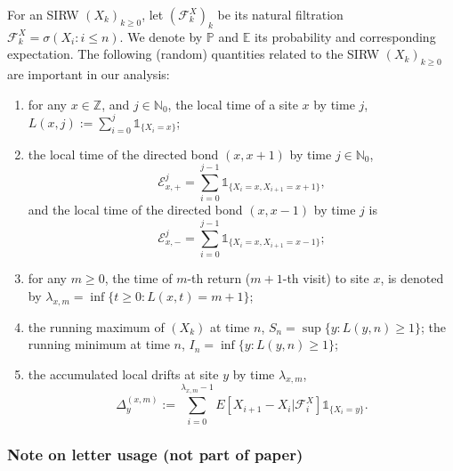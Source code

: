 \documentclass[twoside,12pt,a4paper]{article}
\numberwithin{equation}{section}
\begin{document}
	For an SIRW $(X_k)_{k\geq 0}$,  let $(\mathcal{F}^X_k)_k$ be its natural filtration $\mathcal{F}^X_k = \sigma\left(X_i: i\leq n \right).$ We denote by $\mathbb{P}$ and $\mathbb{E}$ its probability and corresponding expectation. The following (random) quantities related to the SIRW $(X_k)_{k\geq0}$ are important in our analysis:
	\begin{enumerate}
		\item for any $x \in \mathbb{Z}$, and $j\in \mathbb{N}_0$, the local time of a site $x$ by time $j$, $L(x,j):= \sum_{i=0}^j \mathbb{1}_{\{X_i=x\} }$; %
		
		\item the local time of the directed bond $(x,x+1)$ by time $j\in \mathbb{N}_0$,
		$$ \mathcal{E}^j_{x,+} = \sum_{i=0}^{j-1} \mathbb{1}_{\{X_i=x, X_{i+1} =x+1 \} } ,$$
		and the local time of the directed bond $(x,x-1)$ by time $j$ is 
		$$ \mathcal{E}^j_{x,-} = \sum_{i=0}^{j-1} \mathbb{1}_{\{X_i=x, X_{i+1} =x-1 \} }; $$
		
		
		\item for any $m\geq 0$, the time of $m$-th return ($m+1$-th visit) to site $x$, is denoted by $\lambda_{x,m} = \inf\{t \geq 0: L(x,t) = m+1 \}$;
		
		\item the running maximum of $(X_k)$ at time $n$, $S_n= \sup\{y: L(y,n)\geq 1 \} $; the running minimum at time $n$, $I_n= \inf\{y: L(y,n)\geq 1 \} $;
		
		\item 
		the accumulated local drifts at site $y$ by time $\lambda_{x,m}$, 
		\begin{equation}\label{eq: accumulated local drift}
			\Delta_y^{(x,m)}:= \sum_{i=0}^{\lambda_{x,m}-1} E[X_{i+1}-X_i\vert \mathcal{F}_{i}^X] \mathbb{1}_{\{X_i=y\}}.
		\end{equation}
	\end{enumerate}

	\subsubsection{Note on letter usage (not part of paper)}
	
\end{document}
